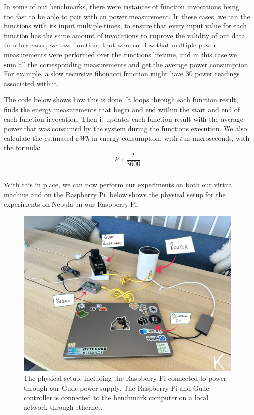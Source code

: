\documentclass[
  table]{report}
\begin{document}
In some of our benchmarks, there were instances of function invocations
being too fast to be able to pair with an power measurement. In these
cases, we ran the functions with its input multiple times, to ensure
that every input value for each function has the same amount of
invocations to improve the validity of our data. In other cases, we saw
functions that were so slow that multiple power measurements were
performed over the functions lifetime, and in this case we sum all the
corresponding measurements and get the average power consumption. For
example, a slow recursive fibonacci function might have 30 power
readings associated with it.

The code below shows how this is done. It loops through each function
result, finds the energy measurements that begin and end within the
start and end of each function invocation. Then it updates each function
result with the average power that was consumed by the system during the
functions execution. We also calculate the estimated \emph{μWh} in
energy consumption, with \emph{t} in microseconds, with the formula:
\[P \times \frac{t}{3600}\]

\inputminted{rust}{assets/code/pair_power_data.rs}

With this in place, we can now perform our experiments on both our
virtual machine and on the Raspberry Pi.  below
shows the physical setup for the experiments on Nebula on our Raspberry
Pi.

\begin{figure}[H]
\centering
  \includegraphics{assets/6-physical_setup.jpg}
  \caption{The physical setup, including the Raspberry Pi connected to power
through our Gude power supply. The Raspberry Pi and Gude controller is connected
to the benchmark computer on a local network through ethernet.}
  \label{fig:physical_setup}
\end{figure}
\end{document}
